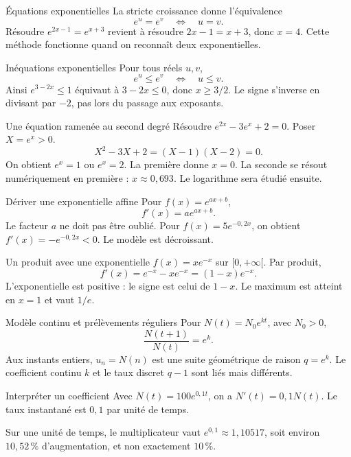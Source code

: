 \documentclass[aspectratio=169,12pt]{beamer}
\begin{document}
\renewcommand{\slidekind}{MÉTHODE \& EXEMPLE}
\begin{frame}[t,fragile]{Équations exponentielles}
La stricte croissance donne l’équivalence\[e^u=e^v\quad\Longleftrightarrow\quad u=v.\] Résoudre $e^{2x-1}=e^{x+3}$ revient à résoudre $2x-1=x+3$, donc $x=4$. Cette méthode fonctionne quand on reconnaît deux exponentielles.
\end{frame}
\renewcommand{\slidekind}{MÉTHODE \& EXEMPLE}
\begin{frame}[t,fragile]{Inéquations exponentielles}
Pour tous réels $u,v$,\[e^u\le e^v\quad\Longleftrightarrow\quad u\le v.\] Ainsi $e^{3-2x}\le1$ équivaut à $3-2x\le0$, donc $x\ge3/2$. Le signe s’inverse en divisant par $-2$, pas lors du passage aux exposants.
\end{frame}
\renewcommand{\slidekind}{MÉTHODE \& EXEMPLE}
\begin{frame}[t,fragile]{Une équation ramenée au second degré}
Résoudre $e^{2x}-3e^x+2=0$. Poser $X=e^x>0$.\[X^2-3X+2=(X-1)(X-2)=0.\] On obtient $e^x=1$ ou $e^x=2$. La première donne $x=0$. La seconde se résout numériquement en première : $x\approx0,693$. Le logarithme sera étudié ensuite.
\end{frame}
\renewcommand{\slidekind}{COMPRENDRE}
\begin{frame}[t,fragile]{Dériver une exponentielle affine}
Pour $f(x)=e^{ax+b}$,\[f\prime(x)=a e^{ax+b}.\] Le facteur $a$ ne doit pas être oublié. Pour $f(x)=5e^{-0,2x}$, on obtient $f\prime(x)=-e^{-0,2x}<0$. Le modèle est décroissant.
\end{frame}
\renewcommand{\slidekind}{COMPRENDRE}
\begin{frame}[t,fragile]{Un produit avec une exponentielle}
$f(x)=xe^{-x}$ sur $[0,+\infty[$. Par produit,\[f\prime(x)=e^{-x}-xe^{-x}=(1-x)e^{-x}.\] L’exponentielle est positive : le signe est celui de $1-x$. Le maximum est atteint en $x=1$ et vaut $1/e$.
\end{frame}
\renewcommand{\slidekind}{COMPRENDRE}
\begin{frame}[t,fragile]{Modèle continu et prélèvements réguliers}
Pour $N(t)=N_0e^{kt}$, avec $N_0>0$,\[\frac{N(t+1)}{N(t)}=e^k.\] Aux instants entiers, $u_n=N(n)$ est une suite géométrique de raison $q=e^k$. Le coefficient continu $k$ et le taux discret $q-1$ sont liés mais différents.
\end{frame}
\renewcommand{\slidekind}{COMPRENDRE}
\begin{frame}[t,fragile]{Interpréter un coefficient}
Avec $N(t)=100e^{0,1t}$, on a $N\prime(t)=0,1N(t)$. Le taux instantané est $0,1$ par unité de temps.\medskip\par Sur une unité de temps, le multiplicateur vaut $e^{0,1}\approx1,10517$, soit environ $10,52\,\%$ d’augmentation, et non exactement $10\,\%$.
\end{frame}
\end{document}
